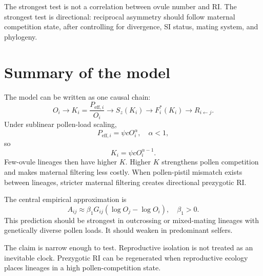 \documentclass[12pt]{article}
\begin{document}
\begin{conclusionbox}
The strongest test is not a correlation between ovule number and RI. The strongest test is directional: reciprocal asymmetry should follow maternal competition state, after controlling for divergence, SI status, mating system, and phylogeny.
\end{conclusionbox}

\section{Summary of the model}

The model can be written as one causal chain:
\begin{equation}
O_i \rightarrow K_i=\frac{P_{\mathrm{eff},i}}{O_i} \rightarrow S_z(K_i) \rightarrow
F_i^*(K_i) \rightarrow R_{i\leftarrow j}.
\end{equation}
Under sublinear pollen-load scaling,
\begin{equation}
P_{\mathrm{eff},i}=\psi cO_i^\alpha,\quad \alpha<1,
\end{equation}
so
\begin{equation}
K_i=\psi cO_i^{\alpha-1}.
\end{equation}
Few-ovule lineages then have higher $K$. Higher $K$ strengthens pollen competition and makes maternal filtering less costly. When pollen-pistil mismatch exists between lineages, stricter maternal filtering creates directional prezygotic RI.

The central empirical approximation is
\begin{equation}
A_{ij}\approx \beta_1G_{ij}(\log O_j-\log O_i),
\quad \beta_1>0.
\end{equation}
This prediction should be strongest in outcrossing or mixed-mating lineages with genetically diverse pollen loads. It should weaken in predominant selfers.

\begin{conclusionbox}
The claim is narrow enough to test. Reproductive isolation is not treated as an inevitable clock. Prezygotic RI can be regenerated when reproductive ecology places lineages in a high pollen-competition state.
\end{conclusionbox}

\newpage
{}
\end{document}

